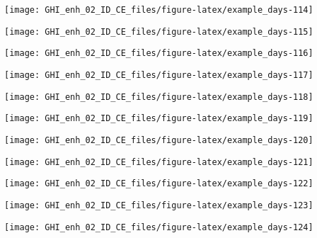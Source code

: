 \documentclass[
  10pt,
  a4paper,oneside]{article}
\begin{document}
\begin{center}\texttt{[image: GHI\_enh\_02\_ID\_CE\_files/figure-latex/example\_days-114]} \end{center}

\begin{center}\texttt{[image: GHI\_enh\_02\_ID\_CE\_files/figure-latex/example\_days-115]} \end{center}

\begin{center}\texttt{[image: GHI\_enh\_02\_ID\_CE\_files/figure-latex/example\_days-116]} \end{center}

\begin{center}\texttt{[image: GHI\_enh\_02\_ID\_CE\_files/figure-latex/example\_days-117]} \end{center}

\begin{center}\texttt{[image: GHI\_enh\_02\_ID\_CE\_files/figure-latex/example\_days-118]} \end{center}

\begin{center}\texttt{[image: GHI\_enh\_02\_ID\_CE\_files/figure-latex/example\_days-119]} \end{center}

\begin{center}\texttt{[image: GHI\_enh\_02\_ID\_CE\_files/figure-latex/example\_days-120]} \end{center}

\begin{center}\texttt{[image: GHI\_enh\_02\_ID\_CE\_files/figure-latex/example\_days-121]} \end{center}

\begin{center}\texttt{[image: GHI\_enh\_02\_ID\_CE\_files/figure-latex/example\_days-122]} \end{center}

\begin{center}\texttt{[image: GHI\_enh\_02\_ID\_CE\_files/figure-latex/example\_days-123]} \end{center}

\begin{center}\texttt{[image: GHI\_enh\_02\_ID\_CE\_files/figure-latex/example\_days-124]} \end{center}
\end{document}
